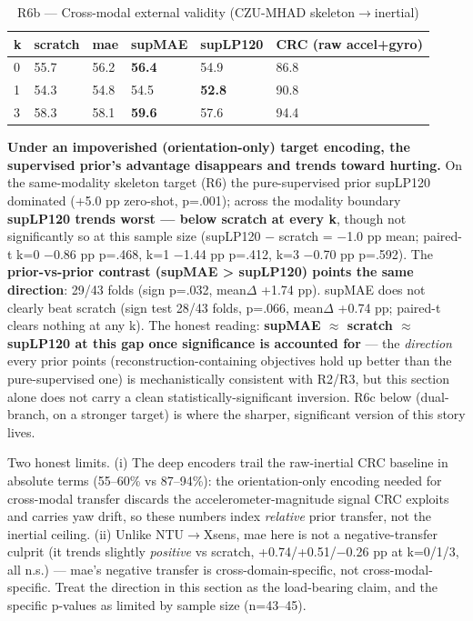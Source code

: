 \begin{table}[!t]
\centering
\caption{R6b --- Cross-modal external validity (CZU-MHAD skeleton$\rightarrow$inertial)}
\small
\begin{tabular}{llllll}
\toprule
k & scratch & mae & supMAE & supLP120 & CRC (raw accel+gyro) \\
\midrule
0 & 55.7 & 56.2 & \textbf{56.4} & 54.9 & 86.8 \\
1 & 54.3 & 54.8 & 54.5 & \textbf{52.8} & 90.8 \\
3 & 58.3 & 58.1 & \textbf{59.6} & 57.6 & 94.4 \\
\bottomrule
\end{tabular}
\end{table}

\textbf{Under an impoverished (orientation-only) target encoding, the supervised prior's advantage disappears and trends toward hurting.} On the same-modality skeleton target (R6) the pure-supervised prior supLP120 dominated (+5.0 pp zero-shot, p=.001); across the modality boundary \textbf{supLP120 trends worst --- below scratch at every k}, though not significantly so at this sample size (supLP120 $-$ scratch = $-$1.0 pp mean; paired-t k=0 $-$0.86 pp p=.468, k=1 $-$1.44 pp p=.412, k=3 $-$0.70 pp p=.592). The \textbf{prior-vs-prior contrast (supMAE > supLP120) points the same direction}: 29/43 folds (sign p=.032, mean$\Delta$ +1.74 pp). supMAE does not clearly beat scratch (sign test 28/43 folds, p=.066, mean$\Delta$ +0.74 pp; paired-t clears nothing at any k). The honest reading: \textbf{supMAE $\approx$ scratch $\approx$ supLP120 at this gap once significance is accounted for} --- the \textit{direction} every prior points (reconstruction-containing objectives hold up better than the pure-supervised one) is mechanistically consistent with R2/R3, but this section alone does not carry a clean statistically-significant inversion. R6c below (dual-branch, on a stronger target) is where the sharper, significant version of this story lives.

Two honest limits. (i) The deep encoders trail the raw-inertial CRC baseline in absolute terms (55--60\% vs 87--94\%): the orientation-only encoding needed for cross-modal transfer discards the accelerometer-magnitude signal CRC exploits and carries yaw drift, so these numbers index \textit{relative} prior transfer, not the inertial ceiling. (ii) Unlike NTU$\rightarrow$Xsens, mae here is not a negative-transfer culprit (it trends slightly \textit{positive} vs scratch, +0.74/+0.51/$-$0.26 pp at k=0/1/3, all n.s.) --- mae's negative transfer is cross-domain-specific, not cross-modal-specific. Treat the direction in this section as the load-bearing claim, and the specific p-values as limited by sample size (n=43--45).

